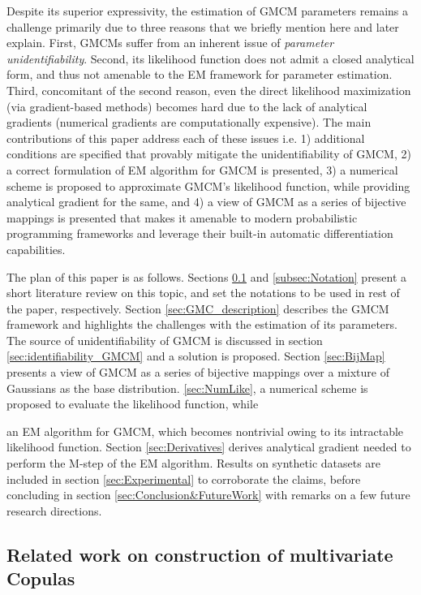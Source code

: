 \documentclass{article}
\begin{document}
Despite its superior expressivity, the estimation of GMCM parameters remains a challenge primarily due to three reasons that we briefly mention here and later explain. First, GMCMs suffer from an inherent issue of \emph{parameter unidentifiability}. Second, its likelihood function does not admit a closed analytical form, and thus not amenable to the EM framework for parameter estimation. Third, concomitant of the second reason, even the direct likelihood maximization (via gradient-based methods) becomes hard due to the lack of analytical gradients (numerical gradients are computationally expensive). The main contributions of this paper address each of these issues i.e. 1) additional conditions are specified that provably mitigate the unidentifiability of GMCM, 2) a correct formulation of EM algorithm for GMCM is presented, 3) a numerical scheme is proposed to approximate GMCM's likelihood function, while providing analytical gradient for the same, and 4) a view of GMCM as a series of bijective mappings is presented that makes it amenable to modern probabilistic programming frameworks and leverage their built-in automatic differentiation capabilities.

The plan of this paper is as follows. Sections \ref{subsec:LitReview} and \ref{subsec:Notation} present a short literature review on this topic, and set the notations to be used in rest of the paper, respectively. Section \ref{sec:GMC_description} describes the GMCM framework and highlights the challenges with the estimation of its parameters. The source of unidentifiability of GMCM is discussed in section \ref{sec:identifiability_GMCM} and a solution is proposed. Section \ref{sec:BijMap} presents a view of GMCM as a series of bijective mappings over a mixture of Gaussians as the base distribution.   \ref{sec:NumLike}, a numerical scheme is proposed to evaluate the likelihood function, while   

an EM algorithm for GMCM, which becomes nontrivial owing to its intractable likelihood function. Section \ref{sec:Derivatives} derives analytical gradient needed to perform the M-step of the EM algorithm. Results on synthetic datasets are included in section \ref{sec:Experimental} to corroborate the claims, before concluding in section \ref{sec:Conclusion&FutureWork} with remarks on a few future research directions.

\subsection{Related work on construction of multivariate Copulas}\label{subsec:LitReview}
\end{document}
